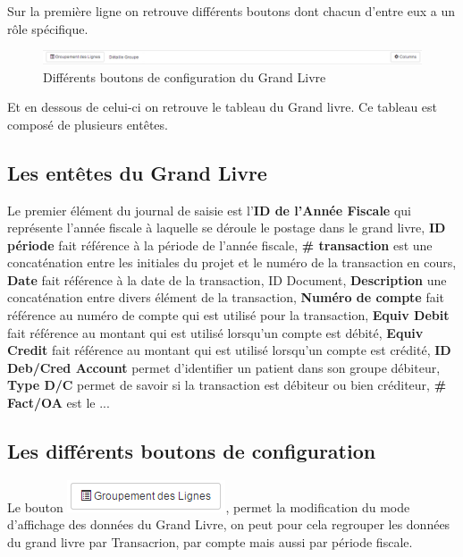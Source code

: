 \documentclass[12pt,a4paper]{report}
\begin{document}
Sur la première ligne on retrouve différents boutons dont chacun d'entre eux a un rôle spécifique.
\begin{figure}[h]
\begin{center}
\includegraphics[width=14cm]{pic/BoutCongGrandLivre.png}
\end{center}
\caption{Différents boutons de configuration du Grand Livre}
\label{Différents boutons de configuration du Grand Livre}
\end{figure}

\newpage

Et en dessous de celui-ci on retrouve le tableau du Grand livre. Ce tableau est composé de plusieurs entêtes. 
\subsection{Les entêtes du Grand Livre}
Le premier élément du journal de saisie est l'\textbf{ID de l'Année Fiscale} qui représente l'année fiscale à laquelle se déroule le postage dans le grand livre,  \textbf{ID période} fait référence à la période de l'année fiscale, \textbf{\# transaction} est une concaténation entre les initiales du projet et le numéro de la transaction en cours, \textbf{Date} fait référence à la date de la transaction, ID Document, \textbf{Description} une concaténation entre divers élément de la transaction, \textbf{Numéro de compte} fait référence au numéro de compte qui est utilisé pour la transaction, \textbf{Equiv Debit} fait référence au montant qui est utilisé lorsqu'un compte est débité,\textbf{ Equiv Credit} fait référence au montant qui est utilisé lorsqu'un compte est crédité, \textbf{ID Deb/Cred Account} permet d'identifier un patient dans son groupe débiteur, \textbf{Type D/C }permet de savoir si la transaction est débiteur ou bien créditeur, \textbf{\# Fact/OA }est le ...

\subsection{Les différents boutons de configuration}

Le bouton \includegraphics[scale=0.7]{pic/GroupLigne.png}, permet la modification du mode d'affichage des données du Grand Livre,  on peut pour cela regrouper les données du grand livre par Transacrion, par compte mais aussi par période fiscale.
\end{document}
